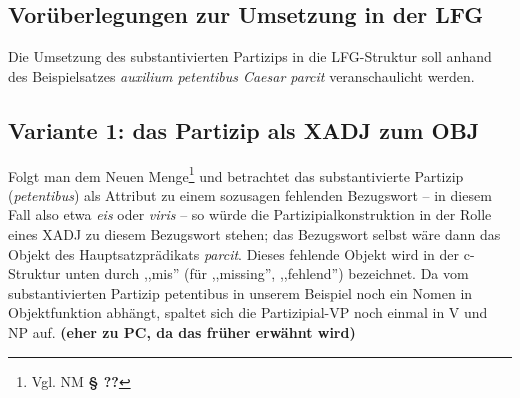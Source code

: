 \documentclass[12pt,a4paper]{article}
\begin{document}
\subsection{Vorüberlegungen zur Umsetzung in der LFG}
Die Umsetzung des substantivierten Partizips in die LFG-Struktur soll anhand des Beispielsatzes \textit{auxilium petentibus Caesar parcit} veranschaulicht werden.


\subsection{Variante 1: das Partizip als XADJ zum OBJ}
Folgt man dem Neuen Menge\footnote{Vgl. NM \textbf{§ ??}} und betrachtet das substantivierte Partizip (\textit{petentibus}) als Attribut zu einem sozusagen fehlenden Bezugswort -- in diesem Fall also etwa \textit{eis} oder \textit{viris} -- so würde die Partizipialkonstruktion in der Rolle eines XADJ zu diesem Bezugswort stehen; das Bezugswort selbst wäre dann das Objekt des Hauptsatzprädikats \textit{parcit}. Dieses fehlende Objekt wird in der c-Struktur unten durch ,,mis'' (für ,,missing'', ,,fehlend'') bezeichnet. Da vom substantivierten Partizip petentibus in unserem Beispiel noch ein Nomen in Objektfunktion abhängt, spaltet sich die Partizipial-VP noch einmal in V und NP auf. \textbf{(eher zu PC, da das früher erwähnt wird)}

\end{document}
